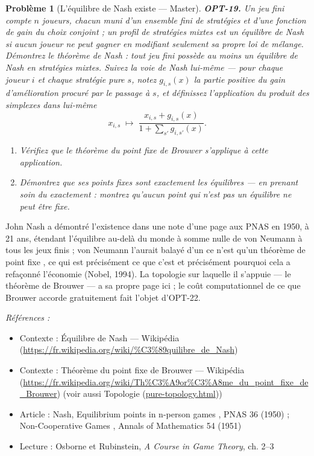 \documentclass[11pt]{article}
\newtheorem{problem}{Problème}
\newenvironment{refs}{\par\small\noindent\emph{Références :}\begin{itemize}\setlength\itemsep{0pt}}{\end{itemize}\normalsize}
\begin{document}
\bigskip

\begin{problem}[{L'équilibre de Nash existe --- Master}]
\textbf{OPT-19.} Un jeu fini compte $n$ joueurs, chacun muni d'un ensemble fini de stratégies et d'une fonction de gain du choix conjoint ; un profil de stratégies mixtes est un équilibre de Nash si aucun joueur ne peut gagner en modifiant seulement sa propre loi de mélange. Démontrez le théorème de Nash : tout jeu fini possède au moins un équilibre de Nash en stratégies mixtes. Suivez la voie de Nash lui-même --- pour chaque joueur $i$ et chaque stratégie pure $s$, notez $g_{i,s}(x)$ la partie positive du gain d'amélioration procuré par le passage à $s$, et définissez l'application du produit des simplexes dans lui-même
\[ x_{i,s} \;\mapsto\; \frac{x_{i,s} + g_{i,s}(x)}{1 + \sum_{s'} g_{i,s'}(x)}. \]
\begin{enumerate}
\item[(a)] Vérifiez que le théorème du point fixe de Brouwer s'applique à cette application.
\item[(b)] Démontrez que ses points fixes sont exactement les équilibres --- en prenant soin du \og{} exactement \fg{} : montrez qu'aucun point qui n'est pas un équilibre ne peut être fixe.
\end{enumerate}

\end{problem}

\noindent John Nash a démontré l'existence dans une note d'une page aux PNAS en 1950, à 21 ans, étendant l'équilibre au-delà du monde à somme nulle de von Neumann à tous les jeux finis ; von Neumann l'aurait balayé d'un \og{} ce n'est qu'un théorème de point fixe \fg{}, ce qui est précisément ce que c'est et précisément pourquoi cela a refaçonné l'économie (Nobel, 1994). La topologie sur laquelle il s'appuie --- le théorème de Brouwer --- a sa propre page ici ; le coût computationnel de ce que Brouwer accorde gratuitement fait l'objet d'OPT-22.

\begin{refs}
\item Contexte : Équilibre de Nash --- Wikipédia (\url{https://fr.wikipedia.org/wiki/%C3%89quilibre_de_Nash})
\item Contexte : Théorème du point fixe de Brouwer --- Wikipédia (\url{https://fr.wikipedia.org/wiki/Th%C3%A9or%C3%A8me_du_point_fixe_de_Brouwer}) (voir aussi Topologie (\url{pure-topology.html}))
\item Article : Nash, \og{} Equilibrium points in n-person games \fg{}, PNAS 36 (1950) ; \og{} Non-Cooperative Games \fg{}, Annals of Mathematics 54 (1951)
\item Lecture : Osborne et Rubinstein, \textit{A Course in Game Theory}, ch. 2--3
\end{refs}
\end{document}

